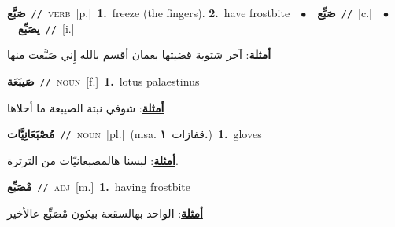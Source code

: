 \documentclass[10pt,a4paper,twoside]{article} %
\begin{document}
\begin{multicols}{2}
{\setlength\topsep{0pt}\textbf{\foreignlanguage{arabic}{صَبَّع}}\ {\color{gray}\texttt{//}\color{black}}\ \textsc{verb}\ [p.]\ \textbf{1.}~freeze (the fingers).  \textbf{2.}~have frostbite\ \ $\bullet$\ \ \setlength\topsep{0pt}\textbf{\foreignlanguage{arabic}{صَبِّع}}\ {\color{gray}\texttt{//}\color{black}}\ [c.]\ \ $\bullet$\ \ \setlength\topsep{0pt}\textbf{\foreignlanguage{arabic}{يصَبِّع}}\ {\color{gray}\texttt{//}\color{black}}\ [i.]\  \begin{flushright}\color{gray}\foreignlanguage{arabic}{\textbf{\underline{\foreignlanguage{arabic}{أمثلة}}}: آخر شتوية قضيتها بعمان أقسم بالله إِني صَبَّعت منها}\end{flushright}\color{black}} \vspace{2mm}

{\setlength\topsep{0pt}\textbf{\foreignlanguage{arabic}{صَيبَعَة}}\ {\color{gray}\texttt{//}\color{black}}\ \textsc{noun}\ [f.]\ \textbf{1.}~lotus palaestinus\  \begin{flushright}\color{gray}\foreignlanguage{arabic}{\textbf{\underline{\foreignlanguage{arabic}{أمثلة}}}: شوفي نبتة الصيبعة ما أحلاها}\end{flushright}\color{black}} \vspace{2mm}

{\setlength\topsep{0pt}\textbf{\foreignlanguage{arabic}{مُصْبَعَانِيَّات}}\ {\color{gray}\texttt{//}\color{black}}\ \textsc{noun}\ [pl.]\ \color{gray}(msa. \foreignlanguage{arabic}{قفازات}~\foreignlanguage{arabic}{\textbf{١.}})\color{black}\ \textbf{1.}~gloves\  \begin{flushright}\color{gray}\foreignlanguage{arabic}{\textbf{\underline{\foreignlanguage{arabic}{أمثلة}}}: لبسنا هالمصبعانيّات من الترترة.}\end{flushright}\color{black}} \vspace{2mm}

{\setlength\topsep{0pt}\textbf{\foreignlanguage{arabic}{مْصَبِّع}}\ {\color{gray}\texttt{//}\color{black}}\ \textsc{adj}\ [m.]\ \textbf{1.}~having frostbite\  \begin{flushright}\color{gray}\foreignlanguage{arabic}{\textbf{\underline{\foreignlanguage{arabic}{أمثلة}}}: الواحد بهالسقعة بيكون مْصَبِّع عالأخير}\end{flushright}\color{black}} \vspace{2mm}


\end{multicols}
\end{document}
